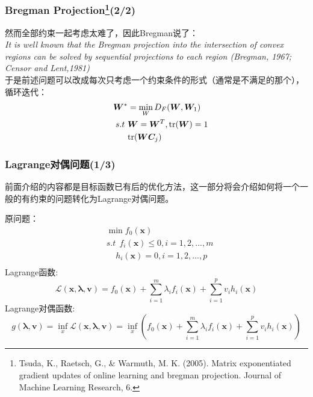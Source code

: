 \documentclass{beamer}
\begin{document}
\begin{frame}\frametitle{Bregman Projection\footnote{Tsuda, K., Raetsch, G., \& Warmuth, M. K. (2005). Matrix exponentiated gradient updates of online learning and bregman projection. Journal of Machine Learning Research, 6.}(2/2)}
然而全部约束一起考虑太难了，因此Bregman说了：\\
\textit{It is well known that the Bregman projection into the intersection of convex regions can be solved by sequential projections to each region (Bregman, 1967; Censor and Lent,1981)}\\
于是前述问题可以改成每次只考虑一个约束条件的形式（通常是不满足的那个），循环迭代：
\begin{displaymath}
\begin{split}
\bm{W}^{*}&=\min_{W} D_F(\bm{W},\bm{W}_1)\\
~~~~s.t~&\bm{W}=\bm{W}^{T},{\rm tr}(\bm{W})=1\\
&{\rm tr}(\bm{W}\bm{C}_j)\\
\end{split}
\end{displaymath}
\end{frame}
\begin{frame}\frametitle{Lagrange对偶问题(1/3)}
\label{Lagrange_Dual_Problem}
前面介绍的内容都是目标函数已有后的优化方法，这一部分将会介绍如何将一个一般的有约束的问题转化为Lagrange对偶问题。

原问题：
\begin{equation}
\label{Original_Prob}
\begin{split}
&\min f_0(\bm{x})\\
&s.t~~f_i(\bm{x})\leq 0,i=1,2,...,m\\
&~~~~~h_i(\bm{x}) =0,i=1,2,...,p\\
\end{split}
\end{equation}
Lagrange函数:
\begin{equation}
\label{Lagrange_Func}
\mathcal{L}(\bm{x},\bm{\lambda},\bm{v})=f_0(\bm{x})+\sum_{i=1}^{m}\lambda_i f_i(\bm{x})+\sum_{i=1}^{p}v_ih_i(\bm{x})
\end{equation}
Lagrange对偶函数:
\begin{equation}
\label{Lagrange_Dual}
g(\bm{\lambda},\bm{v})=\inf_{x}\mathcal{L}(\bm{x},\bm{\lambda},\bm{v})=\inf_{x}\left(f_0(\bm{x})+\sum_{i=1}^{m}\lambda_i f_i(\bm{x})+\sum_{i=1}^{p}v_ih_i(\bm{x})\right)
\end{equation}
\end{frame}
\end{document}
